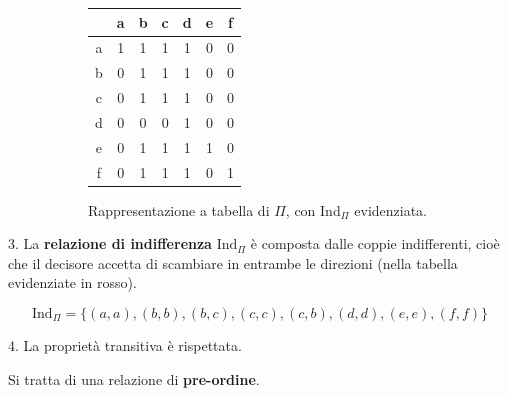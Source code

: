 \documentclass[\main/main.tex]{subfiles}
\begin{document}
\begin{figure}
  \begin{subfigure}{0.49\textwidth}
      \begin{tabular}{|c|c|c|c|c|c|c|}
        \hline
          & a                    & b                    & c                    & d                    & e                    & f                    \\
        \hline
        a & \cellcolor{red!25} 1 & 1                    & 1                    & 1                    & 0                    & 0                    \\
        \hline
        b & 0                    & \cellcolor{red!25} 1 & \cellcolor{red!25} 1 & 1                    & 0                    & 0                    \\
        \hline
        c & 0                    & \cellcolor{red!25} 1 & \cellcolor{red!25} 1 & 1                    & 0                    & 0                    \\
        \hline
        d & 0                    & 0                    & 0                    & \cellcolor{red!25} 1 & 0                    & 0                    \\
        \hline
        e & 0                    & 1                    & 1                    & 1                    & \cellcolor{red!25} 1 & 0                    \\
        \hline
        f & 0                    & 1                    & 1                    & 1                    & 0                    & \cellcolor{red!25} 1 \\
        \hline
      \end{tabular}
      \caption{Rappresentazione a tabella di $\Pi$, con $\text{Ind}_\Pi$ evidenziata.}
  \end{subfigure}
  \begin{subfigure}{0.49\textwidth}
    \IndifferencePreferenceRelationship{}
  \end{subfigure}
\end{figure}

3. La \textbf{relazione di indifferenza} $\text{Ind}_\Pi$ è composta dalle coppie indifferenti, cioè che il decisore accetta di scambiare in entrambe le direzioni (nella tabella evidenziate in rosso).

\[
  \text{Ind}_\Pi = \{(a, a), (b, b), (b,c), (c, c), (c, b), (d,d),(e,e),(f,f)\}
\]

4. La proprietà transitiva è rispettata.

Si tratta di una relazione di \textbf{pre-ordine}.
\end{document}

